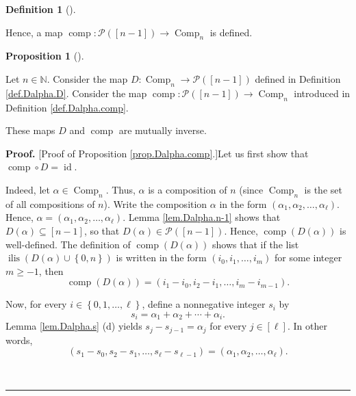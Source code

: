 \documentclass[numbers=enddot,12pt,final,onecolumn,notitlepage,abstracton]{scrartcl}
\theoremstyle{definition}
\newtheorem{prop}[theo]{Proposition}
\newenvironment{proposition}[1][]
{\begin{prop}[#1]\begin{leftbar}}
{\end{leftbar}\end{prop}}
\newtheorem{defi}[theo]{Definition}
\newenvironment{definition}[1][]
{\begin{defi}[#1]\begin{leftbar}}
{\end{leftbar}\end{defi}}
\newenvironment{proof}[1][Proof]{\noindent\textbf{#1.} }{\ \rule{0.5em}{0.5em}}
\newenvironment{verlong}{}{}
\begin{document}
\begin{verlong}
\begin{footnotesize}
\begin{definition}
Hence, a map $\operatorname*{comp}:\mathcal{P}\left(  \left[  n-1\right]
\right)  \rightarrow\operatorname*{Comp}\nolimits_{n}$ is defined.
\end{definition}

\begin{proposition}
\label{prop.Dalpha.comp}Let $n\in\mathbb{N}$. Consider the map
$D:\operatorname*{Comp}\nolimits_{n}\rightarrow\mathcal{P}\left(  \left[
n-1\right]  \right)  $ defined in Definition \ref{def.Dalpha.D}. Consider the
map $\operatorname*{comp}:\mathcal{P}\left(  \left[  n-1\right]  \right)
\rightarrow\operatorname*{Comp}\nolimits_{n}$ introduced in Definition
\ref{def.Dalpha.comp}.

These maps $D$ and $\operatorname*{comp}$ are mutually inverse.
\end{proposition}

\begin{proof}
[Proof of Proposition \ref{prop.Dalpha.comp}.]Let us first show that
$\operatorname*{comp}\circ D=\operatorname*{id}$.

Indeed, let $\alpha\in\operatorname*{Comp}\nolimits_{n}$. Thus, $\alpha$ is a
composition of $n$ (since $\operatorname*{Comp}\nolimits_{n}$ is the set of
all compositions of $n$). Write the composition $\alpha$ in the form $\left(
\alpha_{1},\alpha_{2},\ldots,\alpha_{\ell}\right)  $. Hence, $\alpha=\left(
\alpha_{1},\alpha_{2},\ldots,\alpha_{\ell}\right)  $. Lemma
\ref{lem.Dalpha.n-1} shows that $D\left(  \alpha\right)  \subseteq\left[
n-1\right]  $, so that $D\left(  \alpha\right)  \in\mathcal{P}\left(  \left[
n-1\right]  \right)  $. Hence, $\operatorname*{comp}\left(  D\left(
\alpha\right)  \right)  $ is well-defined. The definition of
$\operatorname*{comp}\left(  D\left(  \alpha\right)  \right)  $ shows that if
the list $\operatorname*{ilis}\left(  D\left(  \alpha\right)  \cup\left\{
0,n\right\}  \right)  $ is written in the form $\left(  i_{0},i_{1}%
,\ldots,i_{m}\right)  $ for some integer $m\geq-1$, then%
\begin{equation}
\operatorname*{comp}\left(  D\left(  \alpha\right)  \right)  =\left(
i_{1}-i_{0},i_{2}-i_{1},\ldots,i_{m}-i_{m-1}\right)  .
\label{pf.prop.Dalpha.comp.cD=}%
\end{equation}


Now, for every $i\in\left\{  0,1,\ldots,\ell\right\}  $, define a nonnegative
integer $s_{i}$ by
\[
s_{i}=\alpha_{1}+\alpha_{2}+\cdots+\alpha_{i}.
\]
Lemma \ref{lem.Dalpha.s} (d) yields $s_{j}-s_{j-1}=\alpha_{j}$ for every
$j\in\left[  \ell\right]  $. In other words,%
\begin{equation}
\left(  s_{1}-s_{0},s_{2}-s_{1},\ldots,s_{\ell}-s_{\ell-1}\right)  =\left(
\alpha_{1},\alpha_{2},\ldots,\alpha_{\ell}\right)  .
\label{pf.prop.Dalpha.comp.6}%
\end{equation}



\end{proof}
\end{footnotesize}
\end{verlong}
\end{document}
